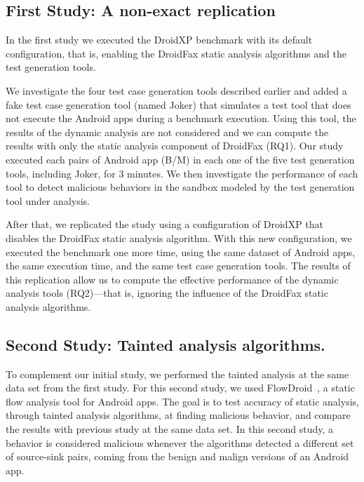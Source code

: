 \subsection{First Study: A non-exact replication}

In the first study we executed the DroidXP benchmark with its
default configuration, that is, enabling the DroidFax
static analysis algorithms and the test generation tools.

We investigate the four test case generation tools described earlier and added a fake test
case generation tool (named Joker) that simulates a test tool that does not execute
the Android apps during a benchmark execution. Using this tool, the results
of the dynamic analysis are not considered and we can compute the results with
only the static analysis component of DroidFax (RQ1). Our study executed each pairs of
Android app (B/M) in each one of the five test generation tools, including Joker,
for $3$ minutes. We then investigate the performance of each tool to detect
malicious behaviors in the sandbox modeled by the test generation tool
under analysis.



After that, we replicated the study using a configuration of DroidXP that
disables the DroidFax static analysis algorithm. With this new configuration,
we executed the benchmark one more time, using the same dataset of Android
apps, the same execution time, and the same test case generation tools.
The results of this replication allow us to compute the effective performance
of the dynamic analysis tools (RQ2)---that is, ignoring the influence of the
DroidFax static analysis algorithms.

\subsection{Second Study: Tainted analysis algorithms.}

To complement our initial study, we performed the tainted analysis at the same
data set from the first study. For this second study, we used
FlowDroid~\cite{10.1145/2666356.2594299}, a static flow analysis tool for Android apps.
The goal is to test accuracy of static analysis, through tainted analysis algorithms, at finding malicious behavior, and compare the results with previous study at the same data set.
In this second study, a behavior is considered malicious whenever the algorithms
detected a different set of source-sink pairs, coming from the benign and malign
versions of an Android app. 

